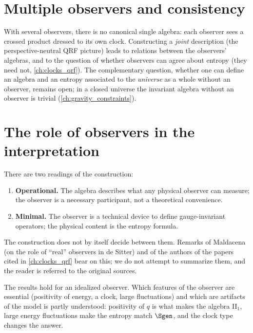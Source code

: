 \section{Multiple observers and consistency}

With several observers, there is no canonical single algebra: each observer sees a crossed product dressed to its own clock. Constructing a \emph{joint} description (the perspective-neutral QRF picture) leads to relations between the observers' algebras, and to the question of whether observers can agree about entropy (they need not, \cref{ch:clocks_qrf}). The complementary question, whether one can define an algebra and an entropy associated to the \emph{universe} as a whole without an observer, remains open; in a closed universe the invariant algebra without an observer is trivial (\cref{ch:gravity_constraints}).

\section{The role of observers in the interpretation}

There are two readings of the construction:
\begin{enumerate}
\item \textbf{Operational.} The algebra describes what any physical observer can measure; the observer is a necessary participant, not a theoretical convenience.
\item \textbf{Minimal.} The observer is a technical device to define gauge-invariant operators; the physical content is the entropy formula.
\end{enumerate}
The construction does not by itself decide between them. Remarks of Maldacena (on the role of ``real'' observers in de Sitter) and of the authors of the papers cited in \cref{ch:clocks_qrf} bear on this; we do not attempt to summarize them, and the reader is referred to the original sources.

\begin{keyidea}
The results hold for an idealized observer. Which features of the observer are essential (positivity of energy, a clock, large fluctuations) and which are artifacts of the model is partly understood: positivity of $q$ is what makes the algebra II$_1$, large energy fluctuations make the entropy match $\Sgen$, and the clock type changes the answer.
\end{keyidea}

